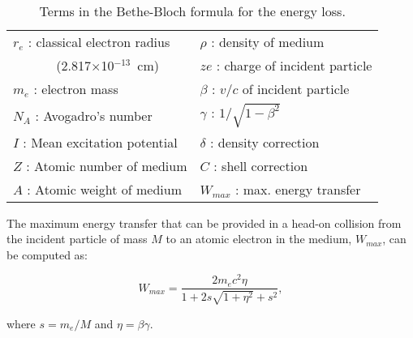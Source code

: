 \begin{table}[htbp]
    \begin{center}
        \begin{tabular} {||l||l||} \hline
            $r_e$ : classical electron radius   & $\rho$ : density of medium \\
            ~~~~~~ (2.817$\times$10$^{-13}$~cm) & $ze$ : charge of incident particle \\
            $m_e$ : electron mass               & $\beta$ : $v/c$ of incident particle \\
            $N_A$ : Avogadro's number           & $\gamma$ : $1/\sqrt{1 - \beta^2}$ \\
            $I$  : Mean excitation potential    & $\delta$ : density correction \\
            $Z$ : Atomic number of medium       & $C$ : shell correction \\
            $A$ : Atomic weight of medium       & $W_{max}$ : max. energy transfer \\ \hline
        \end{tabular}
    \end{center}
    \caption{\small{Terms in the Bethe-Bloch formula for the energy loss.}}
    \label{tab.3.1}
\end{table}

The maximum energy transfer that can be provided in a head-on collision from the incident particle of mass $M$ to an atomic electron in the medium, $W_{max}$, can be computed as:

\begin{equation}
    \label{eq.3.2}
    W_{max} = \frac{2 m_e c^2 \eta}{1 + 2 s \sqrt{1 + \eta^2} + s^2},
\end{equation}

\noindent
where $s = m_e/M$ and $\eta = \beta \gamma$.

